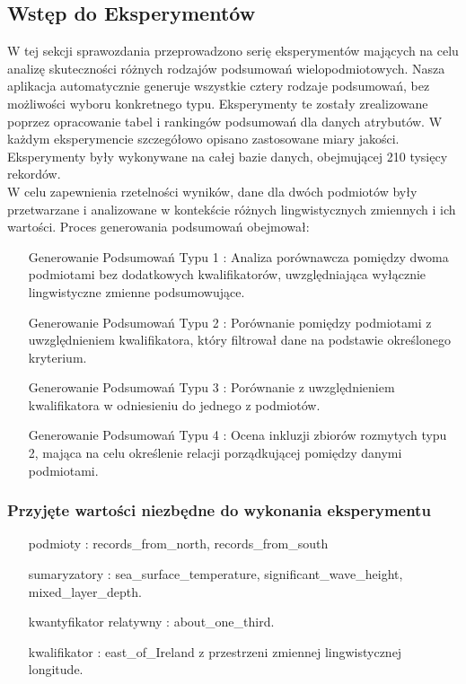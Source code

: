 \documentclass{article}
\begin{document}
\subsection{Wstęp do Eksperymentów}

\noindent W tej sekcji sprawozdania przeprowadzono serię eksperymentów mających na celu analizę skuteczności różnych rodzajów podsumowań wielopodmiotowych. Nasza aplikacja automatycznie generuje wszystkie cztery rodzaje podsumowań, bez możliwości wyboru konkretnego typu. Eksperymenty te zostały zrealizowane poprzez opracowanie tabel i rankingów podsumowań dla danych atrybutów. W każdym eksperymencie szczegółowo opisano zastosowane miary jakości. Eksperymenty były wykonywane na całej bazie danych, obejmującej 210 tysięcy rekordów. \\

\noindent W celu zapewnienia rzetelności wyników, dane dla dwóch podmiotów były przetwarzane i analizowane w kontekście różnych lingwistycznych zmiennych i ich wartości. Proces generowania podsumowań obejmował:

\begin{itemize}
    \item[Generowanie Podsumowań Typu 1]: Analiza porównawcza pomiędzy dwoma podmiotami bez dodatkowych kwalifikatorów, uwzględniająca wyłącznie lingwistyczne zmienne podsumowujące.
    \item[Generowanie Podsumowań Typu 2]: Porównanie pomiędzy podmiotami z uwzględnieniem kwalifikatora, który filtrował dane na podstawie określonego kryterium.
    \item[Generowanie Podsumowań Typu 3]: Porównanie z uwzględnieniem kwalifikatora w odniesieniu do jednego z podmiotów.
    \item[Generowanie Podsumowań Typu 4]: Ocena inkluzji zbiorów rozmytych typu 2, mająca na celu określenie relacji porządkującej pomiędzy danymi podmiotami.
\end{itemize}

\subsubsection{Przyjęte wartości niezbędne do wykonania eksperymentu}

\begin{itemize}
    \item[podmioty]: records\_from\_north, records\_from\_south
    \item[sumaryzatory]: sea\_surface\_temperature, significant\_wave\_height, mixed\_layer\_depth.
    \item[kwantyfikator relatywny]: about\_one\_third.
    \item[kwalifikator]: east\_of\_Ireland z przestrzeni zmiennej lingwistycznej longitude.
\end{itemize}
\end{document}

